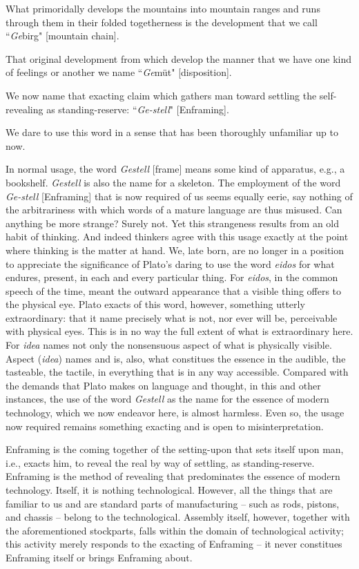 \documentclass[paper=a4, fontsize=11pt,twoside]{scrartcl}
\begin{document}
What primoridally develops the mountains into mountain ranges and runs through them in their folded togetherness is the development that we call ``\textit{Ge}birg" [mountain chain].

That original development from which develop the manner that we have one kind of feelings or another we name ``\textit{Ge}m{\"u}t" [disposition].

We now name that exacting claim which gathers man toward settling the self-revealing as standing-reserve: ``\textit{Ge-stell}" [Enframing].

We dare to use this word in a sense that has been thoroughly unfamiliar up to now.

In normal usage, the word \textit{Gestell} [frame] means some kind of apparatus, e.g., a bookshelf. \textit{Gestell} is also the name for a skeleton. The employment of the word \textit{Ge-stell} [Enframing] that is now required of us seems equally eerie, say nothing of the arbitrariness with which words of a mature language are thus misused. Can anything be more strange? Surely not. Yet this strangeness results from an old habit of thinking. And indeed thinkers agree with this usage exactly at the point where thinking is the matter at hand.  We, late born, are no longer in a position to appreciate the significance of Plato's daring to use the word \textit{eidos} for what endures, present, in each and every particular thing. For \textit{eidos}, in the common speech of the time, meant the outward appearance that a visible thing offers to the physical eye. Plato exacts of this word, however, something utterly extraordinary: that it name precisely what is not, nor ever will be, perceivable with physical eyes. This is in no way the full extent of what is extraordinary here. For \textit{idea} names not only the nonsensuous aspect of what is physically visible. Aspect (\textit{idea}) names and is, also, what constitues the essence in the audible, the tasteable, the tactile, in everything that is in any way accessible. Compared with the demands that Plato makes on language and thought, in this and other instances, the use of the word \textit{Gestell} as the name for the essence of modern technology, which we now endeavor here, is almost harmless. Even so, the usage now required remains something exacting and is open to misinterpretation.

Enframing is the coming together of the setting-upon that sets itself upon man, i.e., exacts him, to reveal the real by way of settling, as standing-reserve. Enframing is the method of revealing that predominates the essence of modern technology. Itself, it is nothing technological. However, all the things that are familiar to us and are standard parts of manufacturing -- such as rods, pistons, and chassis -- belong to the technological. Assembly itself, however, together with the aforementioned stockparts, falls within the domain of technological activity; this activity merely responds to the exacting of Enframing -- it never constitues Enframing itself or brings Enframing about.
\end{document}
